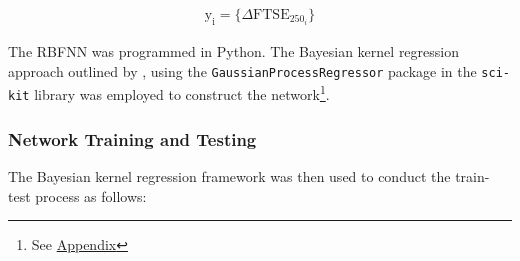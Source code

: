\documentclass[11pt,a4paper]{article}
\newcommand{\citeboth}[1]{\citeauthor{#1} \citep{#1}}
\begin{document}
\begin{align}
    \boldsymbol{\mathrm{y_i}} = \{\Delta \text{FTSE}_{250_i}\}
\end{align}

The RBFNN was programmed in Python. The Bayesian kernel regression approach outlined by 
\citeboth{bishop1995}, using the \texttt{GaussianProcessRegressor} 
package in the \texttt{sci-kit} library was employed to construct the
network\footnote{See \hyperref[sec: appendix]{Appendix}}.

\subsubsection{Network Training and Testing}

The Bayesian kernel regression 
framework was then used to conduct the train-test process as follows:
\end{document}
